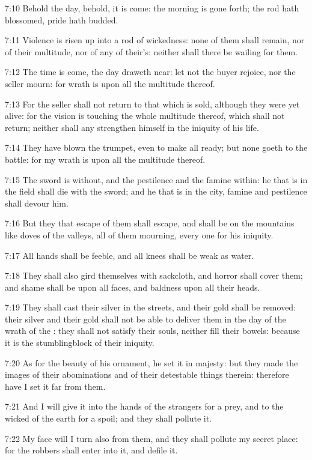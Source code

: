 7:10 Behold the day, behold, it is come: the morning is gone forth; the rod hath blossomed, pride hath budded.

7:11 Violence is risen up into a rod of wickedness: none of them shall remain, nor of their multitude, nor of any of their's: neither shall there be wailing for them.

7:12 The time is come, the day draweth near: let not the buyer rejoice, nor the seller mourn: for wrath is upon all the multitude thereof.

7:13 For the seller shall not return to that which is sold, although they were yet alive: for the vision is touching the whole multitude thereof, which shall not return; neither shall any strengthen himself in the iniquity of his life.

7:14 They have blown the trumpet, even to make all ready; but none goeth to the battle: for my wrath is upon all the multitude thereof.

7:15 The sword is without, and the pestilence and the famine within: he that is in the field shall die with the sword; and he that is in the city, famine and pestilence shall devour him.

7:16 But they that escape of them shall escape, and shall be on the mountains like doves of the valleys, all of them mourning, every one for his iniquity.

7:17 All hands shall be feeble, and all knees shall be weak as water.

7:18 They shall also gird themselves with sackcloth, and horror shall cover them; and shame shall be upon all faces, and baldness upon all their heads.

7:19 They shall cast their silver in the streets, and their gold shall be removed: their silver and their gold shall not be able to deliver them in the day of the wrath of the \LORD: they shall not satisfy their souls, neither fill their bowels: because it is the stumblingblock of their iniquity.

7:20 As for the beauty of his ornament, he set it in majesty: but they made the images of their abominations and of their detestable things therein: therefore have I set it far from them.

7:21 And I will give it into the hands of the strangers for a prey, and to the wicked of the earth for a spoil; and they shall pollute it.

7:22 My face will I turn also from them, and they shall pollute my secret place: for the robbers shall enter into it, and defile it.

